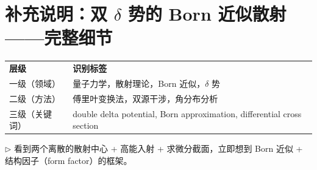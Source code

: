 
\section{补充说明：双 $\delta$ 势的 Born 近似散射——完整细节}
\label{sec:born-detail}

\begin{tipbox}[题型反射弧标签]

\begin{tabular}{ll}
\textbf{层级} & \textbf{识别标签} \\
一级（领域） & 量子力学，散射理论，Born 近似，$\delta$ 势 \\
二级（方法） & 傅里叶变换法，双源干涉，角分布分析 \\
三级（关键词） & double delta potential, Born approximation, differential cross section \\
\end{tabular}

$\triangleright$ 看到两个离散的散射中心 + 高能入射 + 求微分截面，立即想到 Born 近似 + 结构因子（form factor）的框架。
\end{tipbox}

